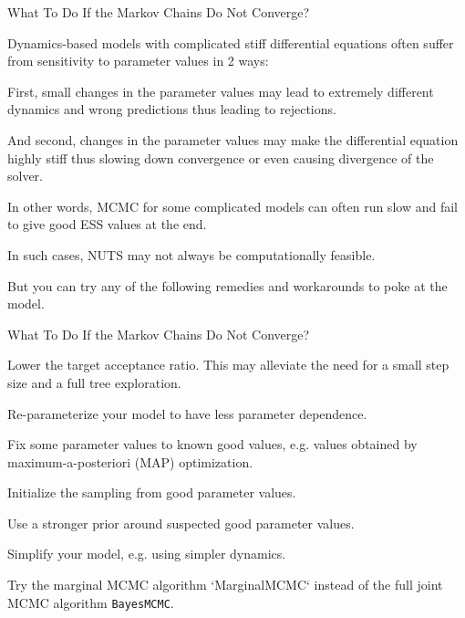 \begin{frame}{What To Do If the Markov Chains Do Not Converge?}
    \begin{vfilleditems}
        \item Dynamics-based models with complicated stiff differential equations often suffer from sensitivity to parameter values in 2 ways:
            \begin{vfilleditems}
                \item First, small changes in the parameter values may lead to extremely different dynamics and wrong predictions thus leading to rejections.
                \item And second, changes in the parameter values may make the differential equation highly stiff thus slowing down convergence or even causing divergence of the solver.
            \end{vfilleditems}
        \item In other words, MCMC for some complicated models can often run slow and fail to give good ESS values at the end.
        \item In such cases, NUTS may not always be computationally feasible.
        \item But you can try any of the following remedies and workarounds to poke at the model.
    \end{vfilleditems}
\end{frame}

\begin{frame}{What To Do If the Markov Chains Do Not Converge?}
    \begin{vfilleditems}
        \item Lower the target acceptance ratio. This may alleviate the need for a small step size and a full tree exploration.
        \item Re-parameterize your model to have less parameter dependence.
        \item Fix some parameter values to known good values, e.g. values obtained by maximum-a-posteriori (MAP) optimization.
        \item Initialize the sampling from good parameter values.
        \item Use a stronger prior around suspected good parameter values.
        \item Simplify your model, e.g. using simpler dynamics.
        \item Try the marginal MCMC algorithm `MarginalMCMC` instead of the full joint MCMC algorithm \lstinline{BayesMCMC}.
    \end{vfilleditems}
\end{frame}

